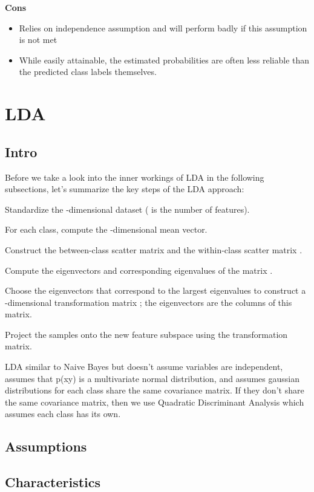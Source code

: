\documentclass[]{book}
\begin{document}
\textbf{Cons}

\begin{itemize}
\item
  Relies on independence assumption and will perform badly if this
  assumption is not met
\item
  While easily attainable, the estimated probabilities are often less
  reliable than the predicted class labels themselves.
\end{itemize}

\section{LDA}\label{lda}

\subsection{Intro}\label{intro-11}

Before we take a look into the inner workings of LDA in the following
subsections, let's summarize the key steps of the LDA approach:

Standardize the -dimensional dataset ( is the number of features).

For each class, compute the -dimensional mean vector.

Construct the between-class scatter matrix and the within-class scatter
matrix .

Compute the eigenvectors and corresponding eigenvalues of the matrix .

Choose the eigenvectors that correspond to the largest eigenvalues to
construct a -dimensional transformation matrix ; the eigenvectors are
the columns of this matrix.

Project the samples onto the new feature subspace using the
transformation matrix.

LDA similar to Naive Bayes but doesn't assume variables are independent,
assumes that p(x\textbar{}y) is a multivariate normal distribution, and
assumes gaussian distributions for each class share the same covariance
matrix. If they don't share the same covariance matrix, then we use
Quadratic Discriminant Analysis which assumes each class has its own.

\subsection{Assumptions}\label{assumptions-11}

\subsection{Characteristics}\label{characteristics-10}
\end{document}
